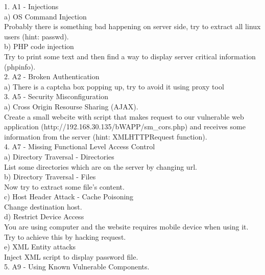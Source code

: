\documentclass[12pt, a4paper]{article}
\begin{document}
1. A1 - Injections\\

a) OS Command Injection\\
Probably there is something bad happening on server side, try to extract all linux users (hint: passwd).\\

b) PHP code injection\\
Try to print some text and then find a way to display server critical information (phpinfo).\\

2. A2 - Broken Authentication\\

a) There is a captcha box popping up, try to avoid it using proxy tool\\

3. A5 - Security Misconfiguration\\

a) Cross Origin Resourse Sharing (AJAX).\\
Create a small webcite with script that makes request to our vulnerable web application (http://192.168.30.135/bWAPP/sm\_cors.php) and receives some information from the server (hint: XMLHTTPRequest function).\\

4. A7 - Missing Functional Level Access Control\\

a) Directory Traversal - Directories\\
List some directories which are on the server by changing url.\\

b) Directory Traversal - Files\\
Now try to extract some file's content.\\

c) Host Header Attack - Cache Poisoning\\
Change destination host.\\

d) Restrict Device Access\\
You are using computer and the website requires mobile device when using it. Try to achieve this by hacking request.\\

e) XML Entity attacks\\
Inject XML script to display password file.\\

5. A9 - Using Known Vulnerable Components.\\
\end{document}
